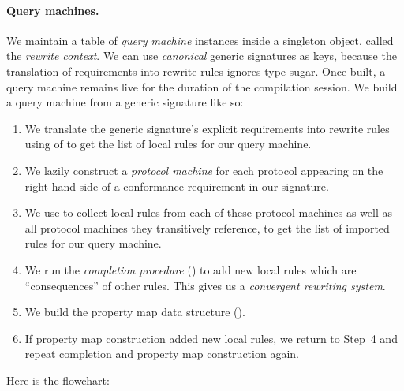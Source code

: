 \documentclass[../generics]{subfiles}
\begin{document}
\paragraph{Query machines.}
We maintain a table of \emph{query machine} instances inside a singleton object, called the \emph{rewrite context}. We can use \emph{canonical} generic signatures as keys, because the translation of requirements into rewrite rules ignores type sugar. Once built, a query machine remains live for the duration of the compilation session. We build a query machine from a generic signature like so:
\begin{enumerate}
\item We translate the generic signature's explicit requirements into rewrite rules using  of  to get the list of local rules for our query machine.

\item We lazily construct a \emph{protocol machine} for each protocol appearing on the right-hand side of a conformance requirement in our signature.

\item We use  to collect local rules from each of these protocol machines as well as all protocol machines they transitively reference, to get the list of imported rules for our query machine.

\item We run the \emph{completion procedure} () to add new local rules which are ``consequences'' of other rules. This gives us a \emph{convergent rewriting system}.

\item We build the property map data structure (). 

\item If property map construction added new local rules, we return to Step~4 and repeat completion and property map construction again.
\end{enumerate}
Here is the flowchart:
\end{document}
